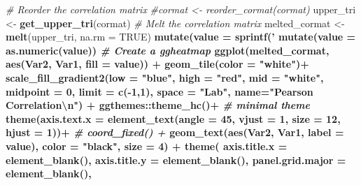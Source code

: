 \documentclass[]{article}
\newenvironment{Shaded}{\begin{snugshade}}{\end{snugshade}}
\newcommand{\KeywordTok}[1]{\textcolor[rgb]{0.13,0.29,0.53}{\textbf{#1}}}
\newcommand{\DataTypeTok}[1]{\textcolor[rgb]{0.13,0.29,0.53}{#1}}
\newcommand{\DecValTok}[1]{\textcolor[rgb]{0.00,0.00,0.81}{#1}}
\newcommand{\CharTok}[1]{\textcolor[rgb]{0.31,0.60,0.02}{#1}}
\newcommand{\StringTok}[1]{\textcolor[rgb]{0.31,0.60,0.02}{#1}}
\newcommand{\CommentTok}[1]{\textcolor[rgb]{0.56,0.35,0.01}{\textit{#1}}}
\newcommand{\OtherTok}[1]{\textcolor[rgb]{0.56,0.35,0.01}{#1}}
\newcommand{\OperatorTok}[1]{\textcolor[rgb]{0.81,0.36,0.00}{\textbf{#1}}}
\newcommand{\NormalTok}[1]{#1}
\begin{document}
\begin{Shaded}
\begin{Highlighting}[]
 \CommentTok{# Reorder the correlation matrix}
 \CommentTok{#cormat <- reorder_cormat(cormat)}
\NormalTok{ upper_tri <-}\StringTok{ }\KeywordTok{get_upper_tri}\NormalTok{(cormat)}
 \CommentTok{# Melt the correlation matrix}
\NormalTok{ melted_cormat <-}\StringTok{ }\KeywordTok{melt}\NormalTok{(upper_tri, }\DataTypeTok{na.rm =} \OtherTok{TRUE}\NormalTok{) }\OperatorTok{%
\StringTok{   }\KeywordTok{mutate}\NormalTok{(}\DataTypeTok{value =} \KeywordTok{sprintf}\NormalTok{(}\StringTok{'%
\StringTok{   }\KeywordTok{mutate}\NormalTok{(}\DataTypeTok{value =} \KeywordTok{as.numeric}\NormalTok{(value))}
 \CommentTok{# Create a ggheatmap}
 \KeywordTok{ggplot}\NormalTok{(melted_cormat, }\KeywordTok{aes}\NormalTok{(Var2, Var1, }\DataTypeTok{fill =}\NormalTok{ value)) }\OperatorTok{+}
\StringTok{  }\KeywordTok{geom_tile}\NormalTok{(}\DataTypeTok{color =} \StringTok{"white"}\NormalTok{)}\OperatorTok{+}
\StringTok{  }\KeywordTok{scale_fill_gradient2}\NormalTok{(}\DataTypeTok{low =} \StringTok{"blue"}\NormalTok{, }\DataTypeTok{high =} \StringTok{"red"}\NormalTok{, }\DataTypeTok{mid =} \StringTok{"white"}\NormalTok{, }
    \DataTypeTok{midpoint =} \DecValTok{0}\NormalTok{, }\DataTypeTok{limit =} \KeywordTok{c}\NormalTok{(}\OperatorTok{-}\DecValTok{1}\NormalTok{,}\DecValTok{1}\NormalTok{), }\DataTypeTok{space =} \StringTok{"Lab"}\NormalTok{, }
     \DataTypeTok{name=}\StringTok{"Pearson Correlation}\CharTok{\textbackslash{}n}\StringTok{"}\NormalTok{) }\OperatorTok{+}
\StringTok{  }\NormalTok{ggthemes}\OperatorTok{::}\KeywordTok{theme_hc}\NormalTok{()}\OperatorTok{+}\StringTok{ }\CommentTok{# minimal theme}
\StringTok{  }\KeywordTok{theme}\NormalTok{(}\DataTypeTok{axis.text.x =} \KeywordTok{element_text}\NormalTok{(}\DataTypeTok{angle =} \DecValTok{45}\NormalTok{, }\DataTypeTok{vjust =} \DecValTok{1}\NormalTok{, }
     \DataTypeTok{size =} \DecValTok{12}\NormalTok{, }\DataTypeTok{hjust =} \DecValTok{1}\NormalTok{))}\OperatorTok{+}
\StringTok{ }\CommentTok{# coord_fixed()  + }
\StringTok{ }\KeywordTok{geom_text}\NormalTok{(}\KeywordTok{aes}\NormalTok{(Var2, Var1, }\DataTypeTok{label =}\NormalTok{ value), }\DataTypeTok{color =} \StringTok{"black"}\NormalTok{, }\DataTypeTok{size =} \DecValTok{4}\NormalTok{) }\OperatorTok{+}
\StringTok{ }\KeywordTok{theme}\NormalTok{(}
   \DataTypeTok{axis.title.x =} \KeywordTok{element_blank}\NormalTok{(),}
   \DataTypeTok{axis.title.y =} \KeywordTok{element_blank}\NormalTok{(),}
   \DataTypeTok{panel.grid.major =} \KeywordTok{element_blank}\NormalTok{(),}
}}
\end{Highlighting}
\end{Shaded}
\end{document}
